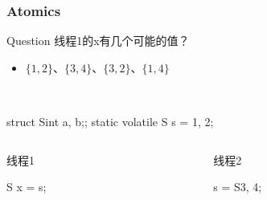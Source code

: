 \documentclass[UTF8,lualatex]{ctexbeamer}
\begin{document}
\begin{frame}[fragile,t]
    \frametitle{Atomics}
    \begin{alertblock}{Question}
        线程1的x有几个可能的值？
        \begin{itemize}
            \item $\{1,2\}$、$\{3,4\}$、$\{3,2\}$、$\{1,4\}$
        \end{itemize}
    \end{alertblock}
    \begin{exampleblock}{~}
        \begin{cppcode}
            struct S{int a, b;};
            static volatile S s = {1, 2};
        \end{cppcode}
    \end{exampleblock}
    \begin{columns}
        \begin{column}{.45\textwidth}
            \begin{exampleblock}{线程1}
                \begin{cppcode}
                    S x = s;
                \end{cppcode}
            \end{exampleblock}
        \end{column}
        \begin{column}{.45\textwidth}
            \begin{exampleblock}{线程2}
                \begin{cppcode}
                    s = S{3, 4};
                \end{cppcode}
            \end{exampleblock}
        \end{column}
    \end{columns}
\end{frame}

\end{document}
